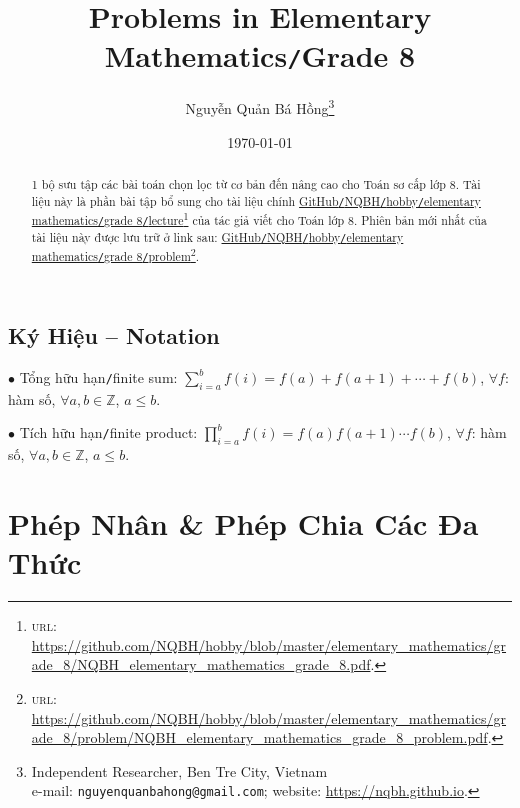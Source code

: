 \documentclass{article}
\title{Problems in Elementary Mathematics\texttt{/}Grade 8}
\author{Nguyễn Quản Bá Hồng\footnote{Independent Researcher, Ben Tre City, Vietnam\\e-mail: \texttt{nguyenquanbahong@gmail.com}; website: \url{https://nqbh.github.io}.}}
\date{\today}
\numberwithin{equation}{section}
\begin{document}
\maketitle
\begin{abstract}
	1 bộ sưu tập các bài toán chọn lọc từ cơ bản đến nâng cao cho Toán sơ cấp lớp 8. Tài liệu này là phần bài tập bổ sung cho tài liệu chính \href{https://github.com/NQBH/hobby/blob/master/elementary_mathematics/grade_8/NQBH_elementary_mathematics_grade_8.pdf}{GitHub\texttt{/}NQBH\texttt{/}hobby\texttt{/}elementary mathematics\texttt{/}grade 8\texttt{/}lecture}\footnote{\textsc{url}: \url{https://github.com/NQBH/hobby/blob/master/elementary_mathematics/grade_8/NQBH_elementary_mathematics_grade_8.pdf}.} của tác giả viết cho Toán lớp 8. Phiên bản mới nhất của tài liệu này được lưu trữ ở link sau: \href{https://github.com/NQBH/hobby/blob/master/elementary_mathematics/grade_8/problem/NQBH_elementary_mathematics_grade_8_problem.pdf}{GitHub\texttt{/}NQBH\texttt{/}hobby\texttt{/}elementary mathematics\texttt{/}grade 8\texttt{/}problem}\footnote{\textsc{url}: \url{https://github.com/NQBH/hobby/blob/master/elementary_mathematics/grade_8/problem/NQBH_elementary_mathematics_grade_8_problem.pdf}.}.
\end{abstract}
\tableofcontents
\newpage


\subsection*{Ký Hiệu -- Notation}
\begin{enumerate*}
	\item[$\bullet$] Tổng hữu hạn\texttt{/}finite sum: $\sum_{i=a}^b f(i) = f(a) + f(a + 1) + \cdots + f(b)$, $\forall f$: hàm số, $\forall a,b\in\mathbb{Z}$, $a\le b$.
	\item[$\bullet$] Tích hữu hạn\texttt{/}finite product: $\prod_{i=a}^b f(i) = f(a)f(a + 1)\cdots f(b)$, $\forall f$: hàm số, $\forall a,b\in\mathbb{Z}$, $a\le b$.
\end{enumerate*}

\section{Phép Nhân \& Phép Chia Các Đa Thức}
\end{document}
